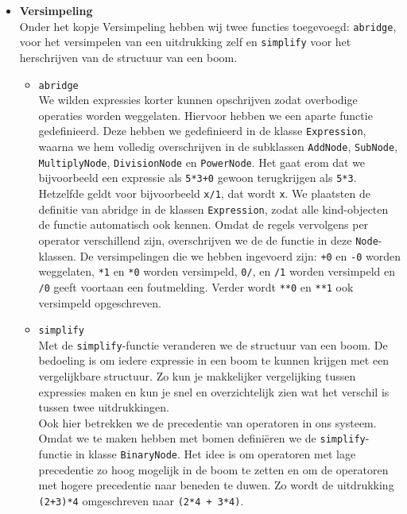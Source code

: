 \documentclass[12pt]{article}
\begin{document}
\begin{itemize}
\item \textbf{Versimpeling}\\
Onder het kopje Versimpeling hebben wij twee functies toegevoegd: \texttt{abridge}, voor het versimpelen van een uitdrukking zelf en \texttt{simplify} voor het herschrijven van de structuur van een boom.
\begin{itemize}
\item \texttt{abridge} \\
We wilden expressies korter kunnen opschrijven zodat overbodige operaties worden weggelaten. Hiervoor hebben we een aparte functie gedefinieerd. Deze hebben we gedefinieerd in de klasse \texttt{Expression}, waarna we hem volledig overschrijven in de  subklassen \texttt{AddNode}, \texttt{SubNode}, \texttt{MultiplyNode}, \texttt{DivisionNode} en \texttt{PowerNode}. Het gaat erom dat we bijvoorbeeld een expressie als \texttt{5*3+0} gewoon terugkrijgen als \texttt{5*3}. Hetzelfde geldt voor bijvoorbeeld \texttt{x/1}, dat wordt \texttt{x}. 
We plaatsten de definitie van abridge in de klassen \texttt{Expression}, zodat alle kind-objecten de functie automatisch ook kennen. Omdat de regels vervolgens per operator verschillend zijn, overschrijven we de de functie in deze \texttt{Node}-klassen. De versimpelingen die we hebben ingevoerd zijn: \texttt{+0} en \texttt{-0} worden weggelaten, \texttt{*1} en \texttt{*0} worden versimpeld, \texttt{0/}, en \texttt{/1} worden versimpeld en \texttt{/0} geeft voortaan een foutmelding. Verder wordt \texttt{**0} en \texttt{**1} ook versimpeld opgeschreven. \\ 
\item \texttt{simplify} \\
Met de \texttt{simplify}-functie veranderen we de structuur van een boom. De bedoeling is om iedere expressie in een boom te kunnen krijgen met een vergelijkbare structuur. Zo kun je makkelijker vergelijking tussen expressies maken en kun je snel en overzichtelijk zien wat het verschil is tussen twee uitdrukkingen. \\ \newline
Ook hier betrekken we de precedentie van operatoren in ons systeem. Omdat we te maken hebben met bomen defini\"eren we de \texttt{simplify}-functie in klasse \texttt{BinaryNode}. Het idee is om operatoren met lage precedentie zo hoog mogelijk in de boom te zetten en om de operatoren met hogere precedentie naar beneden te duwen. Zo wordt  de uitdrukking \texttt{(2+3)*4} omgeschreven naar \texttt{(2*4 + 3*4)}. \\ \newline

\end{itemize}
\end{itemize}
\end{document}
